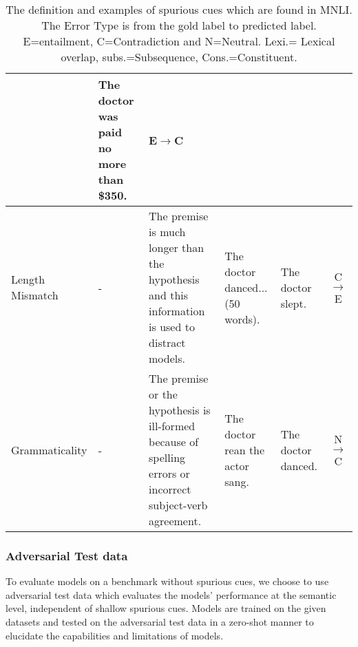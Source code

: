 \begin{table}[th]
\begin{tabular}{
        >{\centering}p{}|
        >{\centering}p{}|
        p{}|
        p{}|
        p{}|
        c}
        & The doctor was paid no more than \$350. 
        & E$\rightarrow$C        
        \\ \midrule
        Length Mismatch          
        & -                                    
        & The premise is much longer than the hypothesis and this information is used to distract models. 
        & The doctor danced...(50 words).     
        & The doctor slept.                      
        & C$\rightarrow$E        
        \\ \midrule
        Grammaticality           
        & -                                    
        & The premise or the hypothesis is ill-formed because of spelling errors or incorrect subject-verb agreement. 
        & The doctor rean the actor sang.     
        & The doctor danced.           
        & N$\rightarrow$C   
        \\ \midrule
        \bottomrule
        \end{tabular}
	\caption{The definition and examples of spurious cues which are found in MNLI. 
	The Error Type is from the gold label to predicted label. E=entailment, C=Contradiction and N=Neutral. 
    Lexi.= Lexical overlap, subs.=Subsequence, Cons.=Constituent.}
	\label{tab:cues}
\end{table}

\subsubsection{Adversarial Test data}

To evaluate models on a benchmark without spurious cues, 
we choose to use adversarial test data which
 evaluates the models' performance at the semantic level, independent of shallow spurious cues. 
Models are trained on the given datasets and tested on 
the adversarial test data in a zero-shot manner to
 elucidate the capabilities and limitations of models.
 
